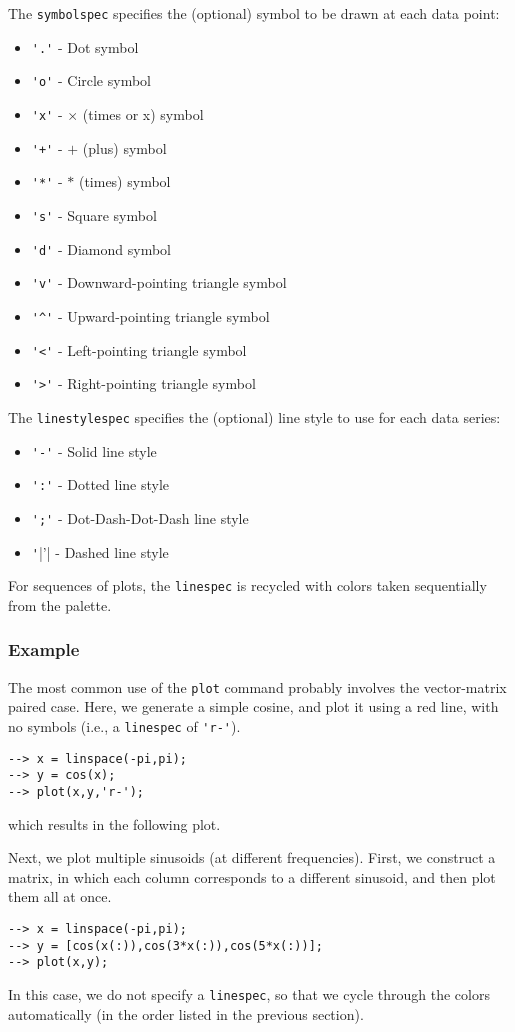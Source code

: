 The \verb|symbolspec| specifies the (optional) symbol to be drawn at each data point:
\begin{itemize}
  \item \verb|'.'| - Dot symbol
  \item \verb|'o'| - Circle symbol
  \item \verb|'x'| - $\times$ (times or x) symbol
  \item \verb|'+'| - $+$ (plus) symbol
  \item \verb|'*'| - $*$ (times) symbol
  \item \verb|'s'| - Square symbol
  \item \verb|'d'| - Diamond symbol
  \item \verb|'v'| - Downward-pointing triangle symbol
  \item \verb|'^'| - Upward-pointing triangle symbol
  \item \verb|'<'| - Left-pointing triangle symbol
  \item \verb|'>'| - Right-pointing triangle symbol
\end{itemize}
The \verb|linestylespec| specifies the (optional) line style to use for each data series:
\begin{itemize}
  \item \verb|'-'| - Solid line style
  \item \verb|':'| - Dotted line style
  \item \verb|';'| - Dot-Dash-Dot-Dash line style
  \item \verb|'||'| - Dashed line style
\end{itemize}
For sequences of plots, the \verb|linespec| is recycled with colors taken sequentially from
the palette.
\subsubsection{Example}
The most common use of the \verb|plot| command probably involves the vector-matrix
paired case.  Here, we generate a simple cosine, and plot it using a red line, with
no symbols (i.e., a \verb|linespec| of \verb|'r-'|).
\begin{verbatim}
--> x = linspace(-pi,pi);
--> y = cos(x);
--> plot(x,y,'r-');
\end{verbatim}
which results in the following plot.


Next, we plot multiple sinusoids (at different frequencies).  First, we construct
a matrix, in which each column corresponds to a different sinusoid, and then plot
them all at once.
\begin{verbatim}
--> x = linspace(-pi,pi);
--> y = [cos(x(:)),cos(3*x(:)),cos(5*x(:))];
--> plot(x,y);
\end{verbatim}
In this case, we do not specify a \verb|linespec|, so that we cycle through the
colors automatically (in the order listed in the previous section).

